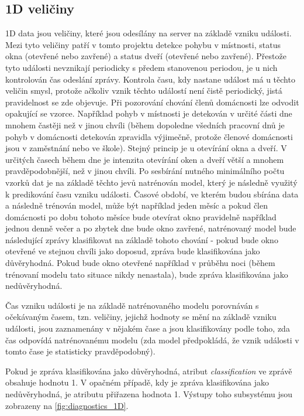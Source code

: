 \subsection{1D veličiny} \label{subsec:1D_quantities}
1D data jsou veličiny, které jsou odesílány na server na základě vzniku události. Mezi tyto veličiny patří v tomto projektu detekce pohybu v místnosti, status okna (otevřené nebo zavřené) a status dveří (otevřené nebo zavřené). Přestože tyto události nevznikají periodicky s předem stanovenou periodou, je u nich kontrolován čas odeslání zprávy. Kontrola času, kdy nastane událost má u těchto veličin smysl, protože ačkoliv vznik těchto událostí není čistě periodický, jistá pravidelnost se zde objevuje. Při pozorování chování členů domácnosti lze odvodit opakující se vzorce. Například pohyb v místnosti je detekován v určité části dne mnohem častěji než v jinou chvíli (během dopoledne všedních pracovní dnů je pohyb v domácnosti detekován zpravidla výjimečně, protože členové domácnosti jsou v zaměstnání nebo ve škole). Stejný princip je u otevírání okna a dveří. V určitých časech během dne je intenzita otevírání oken a dveří větší a mnohem pravděpodobnější, než v jinou chvíli. Po sesbírání nutného minimálního počtu vzorků dat je na základě těchto jevů natrénován model, který je následně využitý k predikování času vzniku události. Časové období, ve kterém budou sbírána data a následně trénován model, může být například jeden měsíc a pokud člen domácnosti po dobu tohoto měsíce bude otevírat okno pravidelně například jednou denně večer a po zbytek dne bude okno zavřené, natrénovaný model bude následující zprávy klasifikovat na základě tohoto chování - pokud bude okno otevřené ve stejnou chvíli jako doposud, zpráva bude klasifikována jako důvěryhodná. Pokud bude okno otevřené například v průběhu noci (během trénovaní modelu tato situace nikdy nenastala), bude zpráva klasifikována jako nedůvěryhodná.\par
Čas vzniku události je na základě natrénovaného modelu porovnáván s očekávaným časem, tzn. veličiny, jejichž hodnoty se mění na základě vzniku události, jsou zaznamenány v nějakém čase a jsou klasifikovány podle toho, zda čas odpovídá natrénovanému modelu (zda model předpokládá, že vznik události v tomto čase je statisticky pravděpodobný). \par
Pokud je zpráva klasifikována jako důvěryhodná, atribut \textit{classification} ve zprávě obsahuje hodnotu 1. V opačném případě, kdy je zpráva klasifikována jako nedůvěryhodná, je atributu přiřazena hodnota 1. Výstupy toho subsystému jsou zobrazeny na \cref{fig:diagnostics_1D}.

